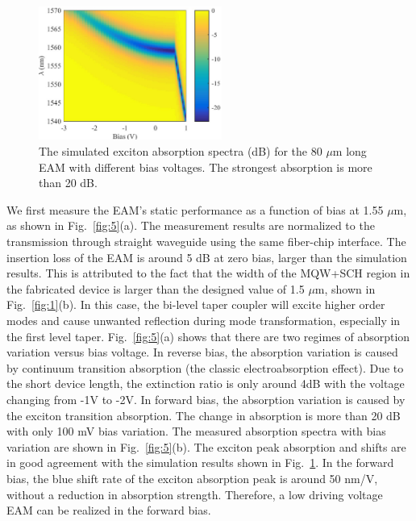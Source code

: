 \documentclass[aip,apl,reprint,a4paper]{revtex4-1}
\begin{document}
\begin{figure}
	\includegraphics[width=6cm]{figure/fig4.eps}%
	\caption{\label{fig:4} The simulated exciton absorption spectra (dB) for the 80 $\mu$m long EAM with different bias voltages. The strongest absorption is more than 20 dB.}
\end{figure}


We first measure the EAM’s static performance as a function of bias at 1.55 $\mu$m, as shown in Fig.~\ref{fig:5}(a). The measurement results are normalized to the transmission through straight waveguide using the same fiber-chip interface. The insertion loss of the EAM is around 5 dB at zero bias, larger than the simulation results. This is attributed to the fact that the width of the MQW+SCH region in the fabricated device is larger than the designed value of 1.5 $\mu$m, shown in Fig.~\ref{fig:1}(b). In this case, the bi-level taper coupler will excite higher order modes and cause unwanted reflection during mode transformation, especially in the first level taper.\cite{huang2015ultracompact} Fig.~\ref{fig:5}(a) shows that there are two regimes of absorption variation versus bias voltage. In reverse bias, the absorption variation is caused by continuum transition absorption (the classic electroabsorption effect). Due to the short device length, the extinction ratio is only around 4dB with the voltage changing from -1V to -2V. In forward bias, the absorption variation is caused by the exciton transition absorption. The change in absorption is more than 20 dB with only 100 mV bias variation. The measured absorption spectra with bias variation are shown in Fig.~\ref{fig:5}(b). The exciton peak absorption and shifts are in good agreement with the simulation results shown in Fig.~\ref{fig:4}. In the forward bias, the blue shift rate of the exciton absorption peak is around 50 nm/V, without a reduction in absorption strength. Therefore, a low driving voltage EAM can be realized in the forward bias.
\end{document}
